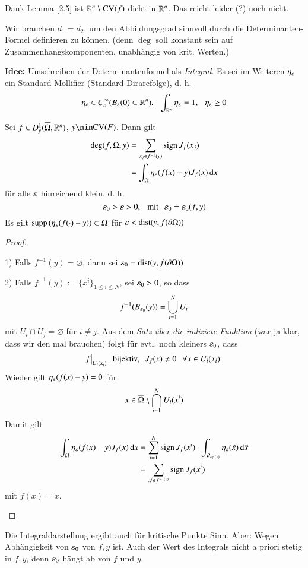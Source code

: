 \noindent Dank Lemma \ref{2.5} ist $\mathbb{R}^n\setminus \mathrm{CV}(f)$ dicht in $\mathbb{R}^n$. Das reicht leider (?)
noch nicht.

\noindent Wir brauchen $d_1=d_2$, um den Abbildungsgrad sinnvoll durch die Determinanten-Formel
definieren zu können. (denn $\deg$ soll konstant sein auf Zusammenhangskomponenten, unabhängig
von krit. Werten.)

\textbf{Idee:} Umschreiben der Determinantenformel als \textit{Integral}.
Es sei im Weiteren $\eta_\varepsilon$ ein Standard-Mollifier (Standard-Dirarcfolge), d. h.
\[
    \eta_\varepsilon \in C^\infty_c(B_\varepsilon(0)\subset \mathbb{R}^n), \hspace{.25cm} \int_{\mathbb{R}^n} \eta_\varepsilon=1,\hspace{.25cm} \eta_\varepsilon\geq 0
\]

\begin{lem}\label{2.6}
    Sei $f\in D^1_y(\overline \Omega, \mathbb{R}^n)$, $y\nin \CV(F)$. Dann gilt
    \begin{align}\label{5}
        \deg(f,\Omega,y)&=\sum_{x_j\in f^{-1}(y)} \mathrm{sign}\, J_f(x_j)\\
                        &= \int_\Omega \eta_\varepsilon (f(x)-y) J_f(x)\, \mathrm{d} x
    \end{align}
    für alle $\varepsilon$ hinreichend klein, d. h.
    \[
        \varepsilon_0>\varepsilon>0, \hspace{.25cm} \text{mit} \hspace{.25cm} \varepsilon_0=\varepsilon_0(f,y)
    \]
    Es gilt $\mathrm{supp}\, (\eta_\varepsilon(f(\cdot)-y))\subset \Omega$ für $\varepsilon < \mathrm{dist}(y,f(\partial \Omega))$
\end{lem}

\begin{proof}
    \begin{description}
        \item{1)} 
        Falls $f^{-1}(y)=\varnothing$, dann sei $\varepsilon_0=\mathrm{dist}(y,f(\partial \Omega))$
        \item{2)}
        Falls $f^{-1}(y):= \{x^i\}_{1\leq i \leq N}$, sei $\varepsilon_0>0$, so dass
        \[
            f^{-1}(B_{\varepsilon_0}(y)) = \bigcup_{i=1}^N U_i
        \]
        mit $U_i\cap U_j=\varnothing$ für $i\neq j$.
        Aus dem \textit{Satz über die imliziete Funktion} (war ja klar, dass wir den mal brauchen)
        folgt für evtl. noch kleiners $\varepsilon_0$, dass
        \[
            f\big|_{U_i(x_i)} \hspace{.25cm} \text{bijektiv,} \hspace{.25cm} J_f(x)\neq 0 \hspace{.25cm} \forall x \in U_i(x_i).
        \]
        Wieder gilt $\eta _{\varepsilon}(f(x)-y)=0$ für
        \[
            x\in \overline \Omega \setminus \bigcap _{i=1}^N U_i(x^i)
        \]
        Damit gilt
        \begin{align*}
            \int_\Omega \eta_\varepsilon(f(x)-y) J_f(x) \, \mathrm{d} x&= \sum_{i=1}^N \mathrm{sign}\, J_f(x^i)\cdot
            \int_{B_{\varepsilon_0(x)}}\eta_\varepsilon (\tilde x ) \, \mathrm{d} \tilde x\\
            &=\sum_{x^i\in f^{-1(y)}} \mathrm{sign}\,  J_f(x^i)
        \end{align*}
        mit $f(x)=\tilde x$.
    \end{description}
    \[ \]
\end{proof}
Die Integraldarstellung ergibt auch für kritische Punkte Sinn. Aber:
Wegen Abhängigkeit von $\varepsilon_0$ von $f,y$ ist. Auch der Wert des Integrals nicht a priori stetig in 
$f,y$, denn $\varepsilon_0$ hängt ab von $f$ und $y$.

